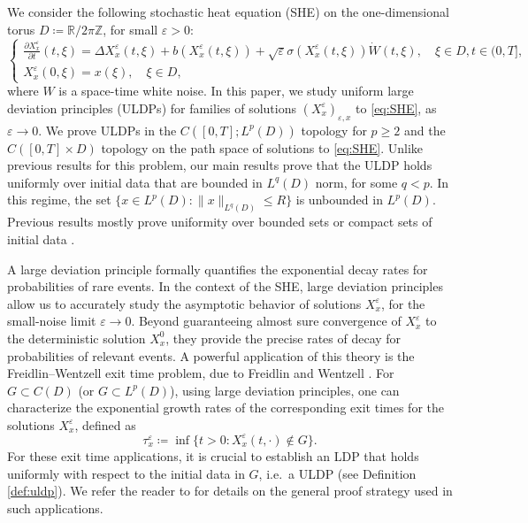 \documentclass{amsart}
\theoremstyle{plain}
\theoremstyle{remark}
\theoremstyle{plain}
\numberwithin{equation}{section}
\newcommand{\Z}{\mathbb{Z}}
\newcommand{\R}{\mathbb{R}}
\newcommand{\ceqq}{\coloneqq}
\newcommand{\eps}{\varepsilon}
\begin{document}
We consider the following stochastic heat equation (SHE)  
on the one-dimensional torus $D\ceqq \R/2\pi\Z$, for small $\eps>0$:  
\begin{equation}\label{eq:SHE}
\begin{cases}
\frac{\partial X_x^{\eps}}{\partial t}(t, \xi) = \Delta X_x^{\eps}(t, \xi) +b(X_x^{\eps}(t,\xi))+ \sqrt{\eps} \sigma(X_x^{\eps}(t, \xi))\dot{W}(t,\xi), \quad  \xi \in D, t \in(0,T], \\ 
X_x^{\eps}(0, \xi) = x(\xi), \quad\xi\in D,
\end{cases} 
\end{equation} 
where $W$ is a space-time white noise.  
In this paper, we study uniform large deviation principles (ULDPs) for families of solutions $(X^\eps_x)_{\eps,x}$ to \eqref{eq:SHE}, as $\eps\to 0$.  We prove ULDPs in the $C([0,T];L^p(D))$ topology  for $p\geq 2$ and the $C([0,T]\times D)$ topology on the path space of solutions to \eqref{eq:SHE}. 
Unlike previous results for this problem, our main results prove that the ULDP holds uniformly over initial data  that are bounded in $L^q(D)$ norm, for some $q<p$. In this regime, the set $\{x \in L^p(D): \|x\|_{L^q(D)} \leq R\}$ is    unbounded in $L^p(D)$. Previous results mostly prove uniformity over bounded sets or compact sets of initial data \cite{CR04,BDM08}.  

A large deviation principle formally quantifies the  exponential decay rates for probabilities of rare events. In the context of the SHE, large deviation principles allow  us to accurately study the asymptotic behavior of solutions  $X_x^\eps$, for the small-noise limit $\eps\to 0$. Beyond guaranteeing almost sure convergence of $X_x^\eps$ to the deterministic solution $X_x^0$, they   provide the precise rates of decay for probabilities of relevant events. A powerful application of this theory is the Freidlin--Wentzell exit time problem, due to Freidlin and Wentzell \cite{FW3rdedition}. For $G\subset C(D)$ (or $G\subset L^p(D)$), using large deviation principles, one can characterize the exponential
growth rates of the corresponding exit times for the solutions $X_x^\eps$, defined as
\[
\tau^\eps_x\ceqq \inf\{t>0:X_x^\eps(t,\cdot)\notin G\}. 
\]
For these exit time applications, it is crucial to establish an LDP that holds uniformly with respect to the initial data in $G$, i.e.\ a ULDP (see Definition \ref{def:uldp}). We refer the reader to  \cite{FW3rdedition,DZ10} for details on the general proof strategy used in such applications. 
\end{document}
